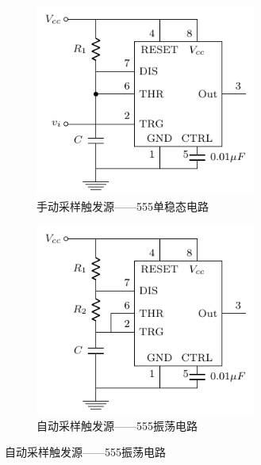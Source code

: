\documentclass[a4paper, 11pt]{article} %
\begin{document}
\begin{figure}[H]
  \centering
  \begin{minipage}[H]{0.48\textwidth}
    \begin{figure}[H]
      \centering
      \includegraphics[width = 0.8\textwidth]{555_mono.pdf}
      \caption{手动采样触发源——555单稳态电路}
    \end{figure}
  \end{minipage}
  \begin{minipage}[H]{0.48\textwidth}
    \begin{figure}[H]
      \centering
      \includegraphics[width = 0.8\textwidth]{555_osc.pdf}
      \caption{自动采样触发源——555振荡电路}
    \end{figure}
  \end{minipage}
\end{figure}
\end{document}
